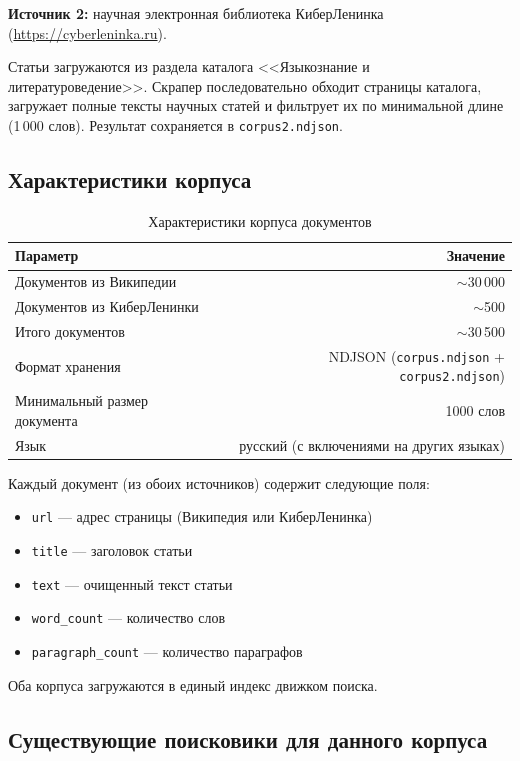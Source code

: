 \textbf{Источник 2:} научная электронная библиотека КиберЛенинка (\url{https://cyberleninka.ru}).

Статьи загружаются из раздела каталога <<Языкознание и литературоведение>>. Скрапер последовательно обходит страницы каталога, загружает полные тексты научных статей и фильтрует их по минимальной длине (1\,000 слов). Результат сохраняется в \texttt{corpus2.ndjson}.

\subsection{Характеристики корпуса}

\begin{table}[H]
\centering
\begin{tabular}{lr}
\toprule
\textbf{Параметр} & \textbf{Значение} \\
\midrule
Документов из Википедии & $\sim$30\,000 \\
Документов из КиберЛенинки & $\sim$500 \\
Итого документов & $\sim$30\,500 \\
Формат хранения & NDJSON (\texttt{corpus.ndjson} + \texttt{corpus2.ndjson}) \\
Минимальный размер документа & 1000 слов \\
Язык & русский (с включениями на других языках) \\
\bottomrule
\end{tabular}
\caption{Характеристики корпуса документов}
\end{table}

Каждый документ (из обоих источников) содержит следующие поля:
\begin{itemize}
    \item \texttt{url} --- адрес страницы (Википедия или КиберЛенинка)
    \item \texttt{title} --- заголовок статьи
    \item \texttt{text} --- очищенный текст статьи
    \item \texttt{word\_count} --- количество слов
    \item \texttt{paragraph\_count} --- количество параграфов
\end{itemize}

Оба корпуса загружаются в единый индекс движком поиска.

\subsection{Существующие поисковики для данного корпуса}

